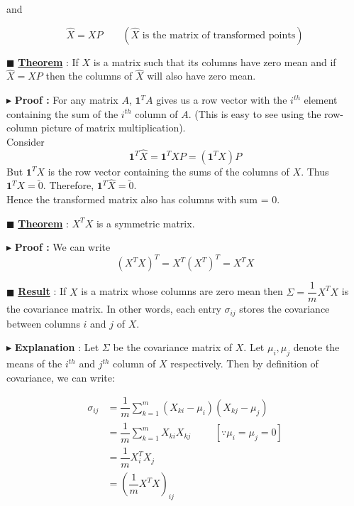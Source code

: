 \documentclass[11pt, a4paper]{article}
\begin{document}
and

\[
\hat{X} = X P
\qquad (\hat{X} \text{ is the matrix of transformed points})
\]


$\blacksquare$ \textbf{\underline{Theorem}} :
If $X$ is a matrix such that its columns have zero mean and if $\hat{X} = X P$ then the columns of $\hat{X}$ will also have zero mean.

$\blacktriangleright$ \textbf{Proof :}
For any matrix $A$, $\mathbf{1}^T A$ gives us a row vector with the $i^{th}$ element containing the sum of the $i^{th}$ column of $A$. (This is easy to see using the row-column picture of matrix multiplication). \\
Consider
\[
\mathbf{1}^T \hat{X} = \mathbf{1}^T X P = \left(\mathbf{1}^T X\right) P
\]
But $\mathbf{1}^T X$ is the row vector containing the sums of the columns of $X$. Thus $\mathbf{1}^T X = \utilde{0}$. Therefore, $\mathbf{1}^T \hat{X} = \utilde{0}$. \\
Hence the transformed matrix also has columns with sum = 0.

\vspace{1em}

$\blacksquare$ \textbf{\underline{Theorem}} :
$X^T X$ is a symmetric matrix.

$\blacktriangleright$ \textbf{Proof :}
We can write
\[
\left( X^T X \right)^T = X^T \left( X^T \right)^T = X^T X
\]


$\blacksquare$ \textbf{\underline{Result}} :
If $X$ is a matrix whose columns are zero mean then $\Sigma = \dfrac{1}{m} X^T X$ is the covariance matrix. In other words, each entry $\sigma_{ij}$ stores the covariance between columns $i$ and $j$ of $X$.

\vspace{1em}

$\blacktriangleright$ \textbf{Explanation} :
Let $\Sigma$ be the covariance matrix of $X$. Let $\mu_i, \mu_j$ denote the means of the $i^{th}$ and $j^{th}$ column of $X$ respectively. Then by definition of covariance, we can write:

\begin{align*}
\sigma_{ij} &= \dfrac{1}{m} \sum\limits_{k=1}^{m} (X_{ki} - \mu_i)(X_{kj} - \mu_j) \\[0.5em]
&= \dfrac{1}{m} \sum\limits_{k=1}^{m} X_{ki} X_{kj} \hspace{1cm} [\because \mu_i = \mu_j = 0] \\[0.5em]
&= \dfrac{1}{m} X_i^T X_j \\[0.5em]
&= \left( \dfrac{1}{m} X^T X \right)_{ij}
\end{align*}
\end{document}
